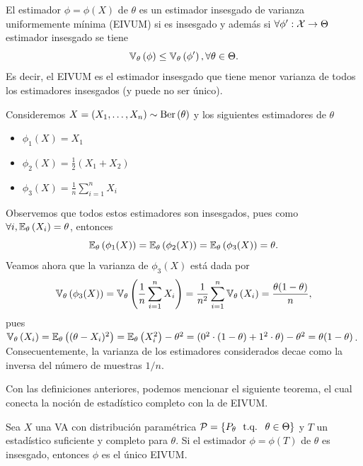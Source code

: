  \begin{definition}
  	El estimador $\phi=\phi(X)$ de $\theta$ es un estimador insesgado de varianza uniformemente mínima (EIVUM) si es insesgado y además si $\forall \phi':{\mathcal X}\rightarrow \Theta$ estimador insesgado se tiene
  	\begin{equation}
  		\mathbb{V}_\theta \left(\phi\right)\leq\mathbb{V}_\theta \left(\phi'\right), \forall \theta\in\Theta.
  	\end{equation}
  	Es decir, el EIVUM es el estimador insesgado que tiene menor varianza de todos los estimadores insesgados (y puede no ser único).
  \end{definition} 

\begin{example}
	Consideremos $X=(X_1,\ldots,X_n)\sim\text{Ber}\left(\theta\right)$ y los siguientes estimadores de $\theta$
	\begin{itemize}
		\item $\phi_1(X) = X_1$
		\item $\phi_2(X) = \frac{1}{2}(X_1+X_2)$
		\item $\phi_3(X) = \frac{1}{n}\sum_{i=1}^n X_i$
	\end{itemize}
	Observemos que todos estos estimadores son insesgados, pues como $\forall i, \mathbb{E}_\theta \left(X_i\right) = \theta$, entonces 
	\begin{equation}
		\mathbb{E}_\theta \left(\phi_1(X)\right) = \mathbb{E}_\theta \left(\phi_2(X)\right) = \mathbb{E}_\theta \left(\phi_3(X)\right) = \theta.
	\end{equation}
	Veamos ahora que la varianza de $\phi_3(X)$ está dada por
	\begin{equation}
		\mathbb{V}_\theta \left(\phi_3(X)\right) = \mathbb{V}_\theta \left(\frac{1}{n}\sum_{i=1}^n X_i\right) = \frac{1}{n^2}\sum_{i=1}^n \mathbb{V}_\theta \left(X_i\right) = \frac{\theta(1-\theta)}{n},
	\end{equation}
	pues $\mathbb{V}_\theta \left(X_i\right) = \mathbb{E}_\theta \left((\theta - X_i)^2\right) = \mathbb{E}_\theta \left(X_i^2\right) - \theta^2 = (0^2 \cdot (1-\theta) + 1^2 \cdot \theta) - \theta^2 = \theta(1-\theta)$. Consecuentemente, la varianza de los estimadores considerados decae como la inversa del número de muestras $1/n$.
\end{example}

Con las definiciones anteriores, podemos mencionar el siguiente teorema, el cual conecta la noción de estadístico completo con la de EIVUM. 

\begin{theorem}
	Sea $X$ una VA con distribución paramétrica $\mathcal{P} = \{P_\theta\ {\text{ t.q. }}\ \theta\in\Theta\}$ y $T$ un estadístico suficiente y completo para $\theta$. Si el estimador $\phi = \phi(T)$ de $\theta$ es insesgado, entonces $\phi$ es el único EIVUM. 
 \end{theorem} 
 
